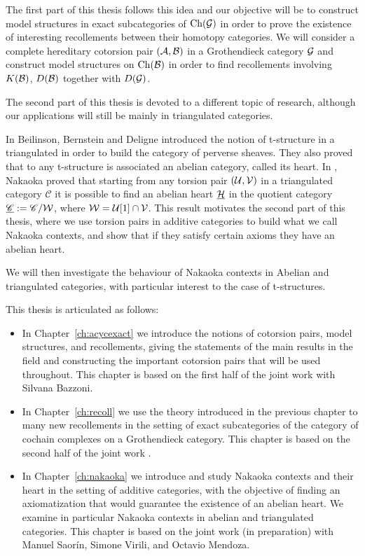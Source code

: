 The first part of this thesis follows this idea and our objective will be to construct model structures in exact subcategories of $\mathrm{Ch}(\mathcal{G})$ in order to prove the existence of interesting recollements between their homotopy categories. We will consider a complete hereditary cotorsion pair $(\mathcal{A},\mathcal{B})$ in a Grothendieck category $\mathcal{G}$ and construct model structures on $\mathrm{Ch}(\mathcal{B})$ in order to find recollements involving $K(\mathcal{B})$, $D(\mathcal{B})$ together with $D(\mathcal{G})$.

The second part of this thesis is devoted to a different topic of research, although our applications will still be mainly in triangulated categories.

In \cite{bbd82} Beilinson, Bernstein and Deligne introduced the notion of t-structure in a triangulated in order to build the category of perverse sheaves. They also proved that to any t-structure is associated an abelian category, called its heart. In \cite{Nakaoka}, Nakaoka proved that starting from any torsion pair $(\mathcal{U},\mathcal{V})$ in a triangulated category $\mathscr{C}$ it is possible to find an abelian heart $\underline{\mathcal{H}}$ in the quotient category $\underline{\mathscr{C}}:=\mathscr{C}/\mathcal{W}$, where $\mathcal{W}=\mathcal{U}[1]\cap\mathcal{V}$. This result motivates the second part of this thesis, where we use torsion pairs in additive categories to build what we call Nakaoka contexts, and show that if they satisfy certain axioms they have an abelian heart.

We will then investigate the behaviour of Nakaoka contexts in Abelian and triangulated categories, with particular interest to the case of t-structures.

\medskip

This thesis is articulated as follows:
\begin{itemize}
  \item In Chapter~\ref{ch:acycexact} we introduce the notions of cotorsion pairs, model structures, and recollements, giving the statements of the main results in the field and constructing the important cotorsion pairs that will be used throughout. This chapter is based on the first half of the joint work \cite{bazzoni2018recollements} with Silvana Bazzoni.
  \item In Chapter~\ref{ch:recoll} we use the theory introduced in the previous chapter to many new recollements in the setting of exact subcategories of the category of cochain complexes on a Grothendieck category. This chapter is based on the second half of the joint work \cite{bazzoni2018recollements}.
  \item In Chapter~\ref{ch:nakaoka} we introduce and study Nakaoka contexts and their heart in the setting of additive categories, with the objective of finding an axiomatization that would guarantee the existence of an abelian heart. We examine in particular Nakaoka contexts in abelian and triangulated categories. This chapter is based on the joint work (in preparation) \cite{mstv2018} with Manuel Saor\'in, Simone Virili, and Octavio Mendoza.
\end{itemize}

